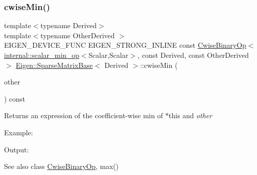 \subsubsection{\texorpdfstring{cwiseMin()}{cwiseMin()}\hspace{0.1cm}{\footnotesize\ttfamily [1/2]}}
{\footnotesize\ttfamily template$<$typename Derived$>$ \\
template$<$typename Other\+Derived $>$ \\
E\+I\+G\+E\+N\+\_\+\+D\+E\+V\+I\+C\+E\+\_\+\+F\+U\+NC E\+I\+G\+E\+N\+\_\+\+S\+T\+R\+O\+N\+G\+\_\+\+I\+N\+L\+I\+NE const \mbox{\hyperlink{class_eigen_1_1_cwise_binary_op}{Cwise\+Binary\+Op}}$<$\mbox{\hyperlink{struct_eigen_1_1internal_1_1scalar__min__op}{internal\+::scalar\+\_\+min\+\_\+op}}$<$Scalar,Scalar$>$, const Derived, const Other\+Derived$>$ \mbox{\hyperlink{class_eigen_1_1_sparse_matrix_base}{Eigen\+::\+Sparse\+Matrix\+Base}}$<$ Derived $>$\+::cwise\+Min (\begin{DoxyParamCaption}\item[{const E\+I\+G\+E\+N\+\_\+\+C\+U\+R\+R\+E\+N\+T\+\_\+\+S\+T\+O\+R\+A\+G\+E\+\_\+\+B\+A\+S\+E\+\_\+\+C\+L\+A\+SS$<$ Other\+Derived $>$ \&}]{other }\end{DoxyParamCaption}) const\hspace{0.3cm}{\ttfamily [inline]}}

\begin{DoxyReturn}{Returns}
an expression of the coefficient-\/wise min of $\ast$this and {\itshape other} 
\end{DoxyReturn}
Example\+: 
\begin{DoxyCodeInclude}{0}
\end{DoxyCodeInclude}
 Output\+: 
\begin{DoxyVerbInclude}
\end{DoxyVerbInclude}


\begin{DoxySeeAlso}{See also}
class \mbox{\hyperlink{class_eigen_1_1_cwise_binary_op}{Cwise\+Binary\+Op}}, max() 
\end{DoxySeeAlso}
\mbox{\label{class_eigen_1_1_sparse_matrix_base_a421fe17d1d5abf656b1630910788268f}} 
